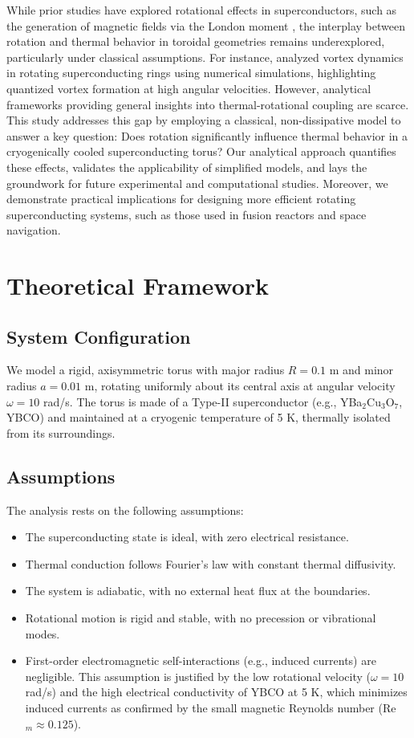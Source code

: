 \documentclass[12pt]{article}
\begin{document}
While prior studies have explored rotational effects in superconductors, such as the generation of magnetic fields via the London moment \citep{Tajmar2007}, the interplay between rotation and thermal behavior in toroidal geometries remains underexplored, particularly under classical assumptions. For instance, \citet{Bulaevskii2022} analyzed vortex dynamics in rotating superconducting rings using numerical simulations, highlighting quantized vortex formation at high angular velocities. However, analytical frameworks providing general insights into thermal-rotational coupling are scarce. This study addresses this gap by employing a classical, non-dissipative model to answer a key question: Does rotation significantly influence thermal behavior in a cryogenically cooled superconducting torus? Our analytical approach quantifies these effects, validates the applicability of simplified models, and lays the groundwork for future experimental and computational studies. Moreover, we demonstrate practical implications for designing more efficient rotating superconducting systems, such as those used in fusion reactors and space navigation.

\section{Theoretical Framework}
\subsection{System Configuration}
We model a rigid, axisymmetric torus with major radius $R = 0.1$ m and minor radius $a = 0.01$ m, rotating uniformly about its central axis at angular velocity $\omega = 10$ rad/s. The torus is made of a Type-II superconductor (e.g., YBa$_2$Cu$_3$O$_7$, YBCO) and maintained at a cryogenic temperature of 5 K, thermally isolated from its surroundings.

\subsection{Assumptions}
The analysis rests on the following assumptions:
\begin{itemize}
    \item The superconducting state is ideal, with zero electrical resistance.
    \item Thermal conduction follows Fourier’s law with constant thermal diffusivity.
    \item The system is adiabatic, with no external heat flux at the boundaries.
    \item Rotational motion is rigid and stable, with no precession or vibrational modes.
    \item First-order electromagnetic self-interactions (e.g., induced currents) are negligible. This assumption is justified by the low rotational velocity ($\omega = 10$ rad/s) and the high electrical conductivity of YBCO at 5 K, which minimizes induced currents as confirmed by the small magnetic Reynolds number (Re$_m \approx 0.125$).
\end{itemize}
\end{document}
